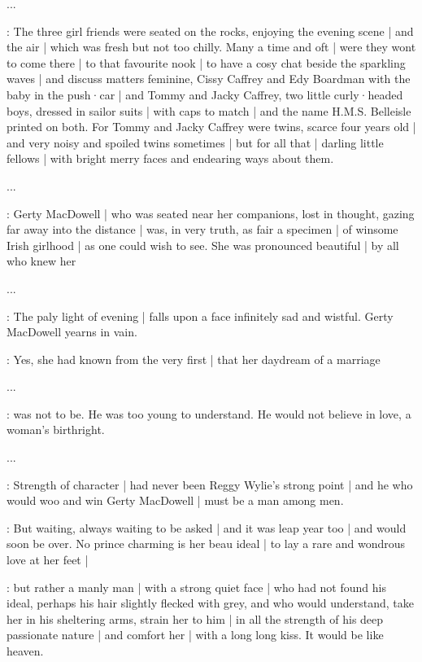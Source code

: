 
...

\Nnovel:
The three girl friends were seated on the rocks,
enjoying the evening scene |
and the air |
which was fresh but not too chilly.%
Many a time and oft |
were they wont to come there |
to that favourite nook |
to have a cosy chat
beside the sparkling waves |
and discuss matters feminine,
Cissy Caffrey
and Edy Boardman with the baby in the push·car |
and Tommy and Jacky Caffrey,
two little curly·headed boys,
dressed in sailor suits |
with caps to match |
and the name H.M.S. Belleisle printed on both.
For Tommy and Jacky Caffrey were twins,
scarce four years old |
and very noisy and spoiled twins sometimes |
but for all that |
darling little fellows |
with bright merry faces and endearing ways about them.

...

\gertyNovel:
Gerty MacDowell |
who was seated near her companions,
lost in thought,
gazing far away into the distance |
was,%
in very truth,
as fair a specimen |
of winsome Irish girlhood |
as one could wish to see.
She was pronounced beautiful |
by all who knew her

...

\gertyNovel:
The paly light of evening |
falls upon a face infinitely sad and wistful.
Gerty MacDowell yearns in vain.

\gertyRomantic:
Yes,
she had known from the very first |
that her daydream of a marriage

...

\gertyRomantic:
was not to be.
He was too young to understand.
He would not believe in love,
a woman's birthright.

...

\gertyRomantic:
Strength of character |
had never been Reggy Wylie's strong point |
and he who would woo and win Gerty MacDowell |
must be a man among men.

\gertyNovel:
But waiting,
always waiting to be asked |
and it was leap year too |
and would soon be over.
No prince charming is her beau ideal |
to lay a rare and wondrous love at her feet |

\gertySex:
but rather a manly man |
with a strong quiet face |
who had not found his ideal,
perhaps his hair slightly flecked with grey,
and who would understand,
take her in his sheltering arms,
strain her to him |
in all the strength of his deep passionate nature |
and comfort her |
with a long long kiss.
It would be like heaven.


